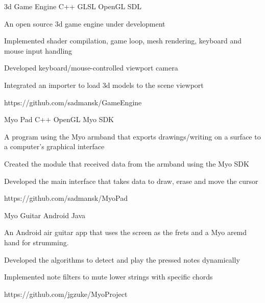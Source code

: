 



\begin{cvprojects}

\cvproject
{3d Game Engine}
{C++ \textbullet{} GLSL \textbullet{} OpenGL \textbullet{} SDL}
{
An open source 3d game engine under development
\begin{cvitems}
\item[]
\item {Implemented shader compilation, game loop, mesh rendering, keyboard and mouse input handling}
\item {Developed keyboard/mouse-controlled viewport camera} 
\item {Integrated an importer to load 3d models to the scene viewport} 
\end{cvitems}
}
{https://github.com/sadmansk/GameEngine}


\cvproject
{Myo Pad}
{C++ \textbullet{} OpenGL \textbullet{} Myo SDK}
{
A program using the Myo armband that exports drawings/writing on a surface to a computer's graphical interface 
\begin{cvitems}
\item[]
\item {Created the module that received data from the armband using the Myo SDK}
\item {Developed the main interface that takes data to draw, erase and move the cursor}
\end{cvitems}
}
{https://github.com/sadmansk/MyoPad}


\cvproject
{Myo Guitar}
{Android \textbullet{} Java}
{
An Android air guitar app that uses the screen as the frets and a Myo aremd hand for strumming.
\begin{cvitems}
\item[]
\item {Developed the algorithms to detect and play the pressed notes dynamically}
\item {Implemented note filters to mute lower strings with specific chords}
\end{cvitems}
}
{https://github.com/jgzuke/MyoProject}


\end{cvprojects}
